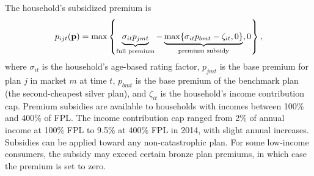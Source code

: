\documentclass[12pt]{article}
\begin{document}
The household's subsidized premium is
\begin{equation}
\label{eqn:cons_premium}
	p_{ijt}({\bf p}) = \max \left \lbrace \underbrace{\sigma_{it} p_{jmt}}_{\text{\scriptsize{full premium}}}  - \underbrace{\max\{\sigma_{it} p_{bmt} - \zeta_{it},0\}}_{\text{\scriptsize{premium subsidy}}},0 \right \rbrace,
\end{equation}
where $\sigma_{it}$ is the household's age-based rating factor, $p_{jmt}$ is the base premium for plan $j$ in market $m$ at time $t$, $p_{bmt}$ is the base premium of the benchmark plan (the second-cheapest silver plan), and $\zeta_{it}$ is the household's income contribution cap. Premium subsidies are available to households with incomes between 100\% and 400\% of FPL. The income contribution cap ranged from 2\% of annual income at 100\% FPL to 9.5\% at 400\% FPL in 2014, with slight annual increases. Subsidies can be applied toward any non-catastrophic plan. For some low-income consumers, the subsidy may exceed certain bronze plan premiums, in which case the premium is set to zero.
\end{document}
